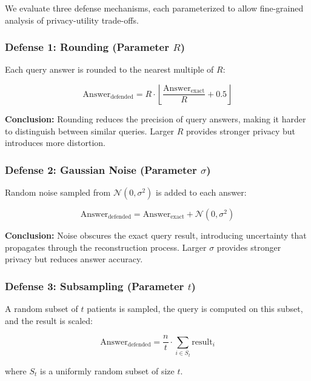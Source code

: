 \documentclass[11pt,letterpaper]{article}
\begin{document}
We evaluate three defense mechanisms, each parameterized to allow fine-grained analysis of privacy-utility trade-offs.

\subsubsection{Defense 1: Rounding (Parameter $R$)}

Each query answer is rounded to the nearest multiple of $R$:

\begin{equation}
    \text{Answer}_{\text{defended}} = R \cdot \left\lfloor \frac{\text{Answer}_{\text{exact}}}{R} + 0.5 \right\rfloor
\end{equation}

\textbf{Conclusion:} Rounding reduces the precision of query answers, making it harder to distinguish between similar queries. Larger $R$ provides stronger privacy but introduces more distortion.

\subsubsection{Defense 2: Gaussian Noise (Parameter $\sigma$)}

Random noise sampled from $\mathcal{N}(0, \sigma^2)$ is added to each answer:

\begin{equation}
    \text{Answer}_{\text{defended}} = \text{Answer}_{\text{exact}} + \mathcal{N}(0, \sigma^2)
\end{equation}

\textbf{Conclusion:} Noise obscures the exact query result, introducing uncertainty that propagates through the reconstruction process. Larger $\sigma$ provides stronger privacy but reduces answer accuracy.

\subsubsection{Defense 3: Subsampling (Parameter $t$)}

A random subset of $t$ patients is sampled, the query is computed on this subset, and the result is scaled:

\begin{equation}
    \text{Answer}_{\text{defended}} = \frac{n}{t} \cdot \sum_{i \in S_t} \text{result}_i
\end{equation}

where $S_t$ is a uniformly random subset of size $t$.
\end{document}
